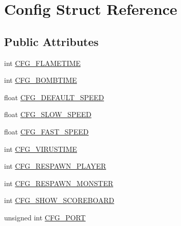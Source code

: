 \hypertarget{struct_config}{\section{Config Struct Reference}
\label{struct_config}
}
\subsection*{Public Attributes}
\begin{DoxyCompactItemize}
\item 
int \hyperlink{struct_config_a2660688203b9170918c7e2e8e5b54ed4}{C\-F\-G\-\_\-\-F\-L\-A\-M\-E\-T\-I\-M\-E}
\item 
int \hyperlink{struct_config_a0574d1159f4788df4ba510d1d3e83498}{C\-F\-G\-\_\-\-B\-O\-M\-B\-T\-I\-M\-E}
\item 
float \hyperlink{struct_config_a8f2b0ec592b0bda65e2133e21fe46979}{C\-F\-G\-\_\-\-D\-E\-F\-A\-U\-L\-T\-\_\-\-S\-P\-E\-E\-D}
\item 
float \hyperlink{struct_config_a1e059aee7b0dccef0baeae3ac1e51ff8}{C\-F\-G\-\_\-\-S\-L\-O\-W\-\_\-\-S\-P\-E\-E\-D}
\item 
float \hyperlink{struct_config_a2e8f4b387f08e51b6bfc9c27905beb60}{C\-F\-G\-\_\-\-F\-A\-S\-T\-\_\-\-S\-P\-E\-E\-D}
\item 
int \hyperlink{struct_config_a27f5415363ce485450a5e565fc07eedf}{C\-F\-G\-\_\-\-V\-I\-R\-U\-S\-T\-I\-M\-E}
\item 
int \hyperlink{struct_config_a4dca8b903aa44d2eeac1360b3bd8abe3}{C\-F\-G\-\_\-\-R\-E\-S\-P\-A\-W\-N\-\_\-\-P\-L\-A\-Y\-E\-R}
\item 
int \hyperlink{struct_config_a68f25bf53407aa4d78dbf20810084c21}{C\-F\-G\-\_\-\-R\-E\-S\-P\-A\-W\-N\-\_\-\-M\-O\-N\-S\-T\-E\-R}
\item 
int \hyperlink{struct_config_a4d8faf4496d7fad5ce922354581e7c2b}{C\-F\-G\-\_\-\-S\-H\-O\-W\-\_\-\-S\-C\-O\-R\-E\-B\-O\-A\-R\-D}
\item 
unsigned int \hyperlink{struct_config_a2ee7154f605e424def9f1289e328f331}{C\-F\-G\-\_\-\-P\-O\-R\-T}
\end{DoxyCompactItemize}


